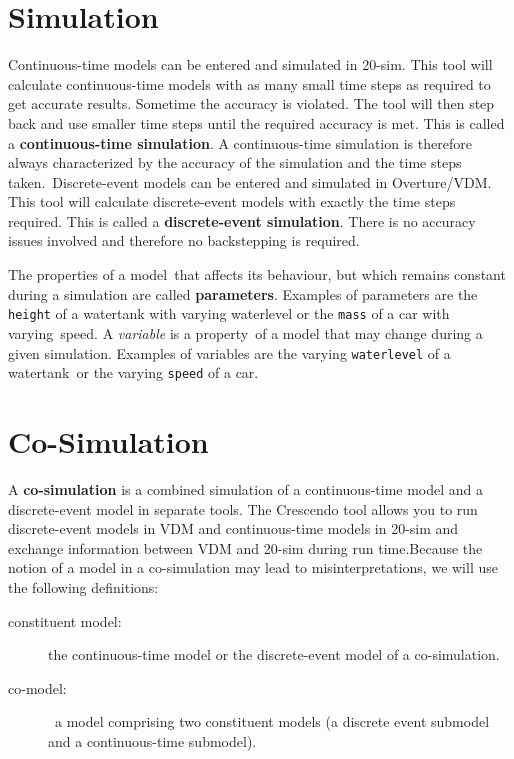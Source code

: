 \documentclass{crescendorepchap}
\begin{document}
\section{Simulation}

Continuous-time models can be entered and simulated in 20-sim. This tool
will calculate continuous-time models with as many small time steps as
required to get accurate results. Sometime the accuracy is violated. The
tool will then step back and use smaller time steps until the required
accuracy is met. This is called a \textbf{continuous-time simulation}. A
continuous-time simulation is therefore always characterized by the
accuracy of the simulation and the time steps taken.~Discrete-event
models can be entered and simulated in Overture/VDM. This tool will calculate
discrete-event models with exactly the time steps required. This is
called a \textbf{discrete-event simulation}. There is no accuracy issues
involved and therefore no backstepping is required.

The properties of a model~that affects its behaviour, but which remains
constant during a simulation are called \textbf{parameters}. Examples of
parameters are the \texttt{height} of a watertank with varying waterlevel or
the \texttt{mass} of a car with varying~speed. A \emph{variable} is a
property~of a model that may change during a given simulation. Examples
of variables are the varying \texttt{waterlevel} of a watertank~or the
varying \texttt{speed} of a car.

\section{Co-Simulation}

A \textbf{co-simulation} is a combined simulation of a continuous-time
model and a discrete-event model in separate tools. The Crescendo tool
allows you to run discrete-event models in VDM and continuous-time
models in 20-sim and exchange information between VDM and 20-sim during
run time.Because the notion of a model in a co-simulation may lead
to misinterpretations, we will use the following definitions:

\begin{description}
\item[constituent model:] the continuous-time model or the
  discrete-event model of a co-simulation.
\item[co-model:]~a model comprising two constituent models (a
  discrete event submodel and a continuous-time submodel).
\end{description}
\end{document}
